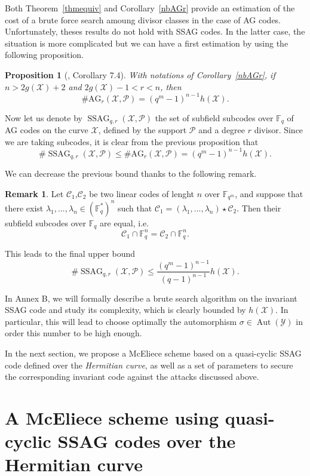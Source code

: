 \documentclass[10pt]{article}
\newtheorem{prop1}[thm]{Proposition}
\theoremstyle{definition}
\newtheorem{rq1}[thm]{Remark}
\theoremstyle{definition}
\theoremstyle{definition}
\newcommand{\C}{\mathcal{C}}
\newcommand{\Fqm}{\mathbb{F}_{q^m}}
\newcommand{\Fq}{\mathbb{F}_q}
\newcommand{\X}{\mathcal{X}}
\newcommand{\Y}{\mathcal{Y}}
\newcommand{\PR}{\mathcal{P}}
\newcommand{\Aut}{\operatorname{Aut}}
\newcommand{\ssag}{\operatorname{SSAG}}
\begin{document}
Both Theorem~\ref{thmequiv} and Corollary~\ref{nbAGr} provide an estimation of the cost of a brute force search amoung divisor classes in the case of AG codes. Unfortunately,  theses results do not hold with SSAG codes. In the latter case, the situation is more complicated but we can have a first estimation by using the following proposition.

\begin{prop1}[\cite{CMRP}, Corollary 7.4] 
With notations of Corollary~\ref{nbAGr}, if $n>2g(\X)+2$ and $2g(\X)-1<r<n$, then 
\[\#\mathrm{AG}_r(\X,\PR) = (q^m-1)^{n-1}h(\X).\]
\end{prop1}

Now let us denote by $\ssag_{q,r}(\X,\PR)$ the set of subfield subcodes over $\Fq$ of AG codes on the curve $\X$, defined by the support $\PR$ and a degree $r$ divisor. Since we are taking subcodes, it is clear from the previous proposition that 
\[\#\ssag_{q,r}(\X,\PR) \leq \#\mathrm{AG}_r(\X,\PR) = (q^m-1)^{n-1}h(\X).\]

We can decrease the previous bound thanks to the following remark.

\begin{rq1}
Let $\C_1$,$\C_2$ be two linear codes of lenght $n$ over $\Fqm$, and suppose that there exist $\lambda_1,...,\lambda_n \in (\Fq^*)^n$ such that $\C_1 = (\lambda_1,...,\lambda_n) \star \C_2$. Then their subfield subcodes over $\Fq$ are equal, i.e.
\[\C_1 \cap \Fq^n = \C_2 \cap \Fq^n.\]
\end{rq1}

This leads to the final upper bound 
\begin{equation} \label{nb of sssag}
 \#\ssag_{q,r}(\X,\PR) \leq \dfrac{(q^m-1)^{n-1}}{(q-1)^{n-1}}h(\X).
\end{equation} 

In Annex B, we will formally describe a brute search algorithm on the invariant SSAG code and study its complexity, which is clearly bounded by $h(\X)$. In particular, this will lead to choose optimally the automorphism $\sigma \in \Aut(\Y)$ in order this number to be high enough.



In the next section, we propose a McEliece scheme based on a quasi-cyclic SSAG code defined over the \textit{Hermitian curve}, as well as a set of parameters to secure the corresponding invariant code against the attacks discussed above.


\section{A McEliece scheme using quasi-cyclic SSAG codes over the Hermitian curve}
\end{document}
